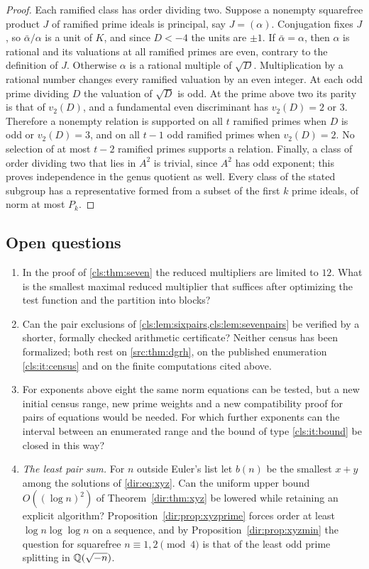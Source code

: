 \begin{proof}
Each ramified class has order dividing two. Suppose a nonempty squarefree product $J$ of
ramified prime ideals is principal, say $J=(\alpha)$. Conjugation fixes $J$, so
$\bar\alpha/\alpha$ is a unit of $K$, and since $D<-4$ the units are $\pm1$. If
$\bar\alpha=\alpha$, then $\alpha$ is rational and its valuations at all ramified primes
are even, contrary to the definition of $J$. Otherwise $\alpha$ is a rational multiple of
$\sqrt D$. Multiplication by a rational number changes every ramified valuation by an even
integer. At each odd prime dividing $D$ the valuation of $\sqrt D$ is odd. At the prime
above two its parity is that of $v_2(D)$, and a fundamental even discriminant has
$v_2(D)=2$ or $3$. Therefore a nonempty relation is supported on all $t$ ramified primes
when $D$ is odd or $v_2(D)=3$, and on all $t-1$ odd ramified primes when $v_2(D)=2$. No
selection of at most $t-2$ ramified primes supports a relation. Finally, a class of order
dividing two that lies in $A^2$ is trivial, since $A^2$ has odd exponent; this proves
independence in the genus quotient as well. Every class of the stated subgroup has a
representative formed from a subset of the first $k$ prime ideals, of norm at most $P_k$.
\end{proof}

\subsection{Open questions}\label{cls:sec:open}

\begin{enumerate}
\item In the proof of \cref{cls:thm:seven} the reduced multipliers are limited to $12$.
What is the smallest maximal reduced multiplier that suffices after optimizing the test
function and the partition into blocks?
\item Can the pair exclusions of \cref{cls:lem:sixpairs,cls:lem:sevenpairs} be verified by
a shorter, formally checked arithmetic certificate? Neither census has been formalized;
both rest on \cref{src:thm:dgrh}, on the published enumeration \ref{cls:it:census} and on
the finite computations cited above.
\item For exponents above eight the same norm equations can be tested, but a new initial
census range, new prime weights and a new compatibility proof for pairs of equations would
be needed. For which further exponents can the interval between an enumerated range and
the bound of type \ref{cls:it:bound} be closed in this way?
\item \emph{The least pair sum.} For $n$ outside Euler's list let $b(n)$ be the
 smallest $x+y$ among the solutions of \eqref{dir:eq:xyz}. Can the uniform upper bound
 $O((\log n)^2)$ of Theorem~\ref{dir:thm:xyz} be lowered while retaining an explicit
 algorithm? Proposition~\ref{dir:prop:xyzprime} forces order at least $\log n\log\log n$ on a
 sequence, and by Proposition~\ref{dir:prop:xyzmin} the question for squarefree $n\equiv1,2\pmod4$
 is that of the least odd prime splitting in $\mathbb{Q}(\sqrt{-n})$.
\end{enumerate}
